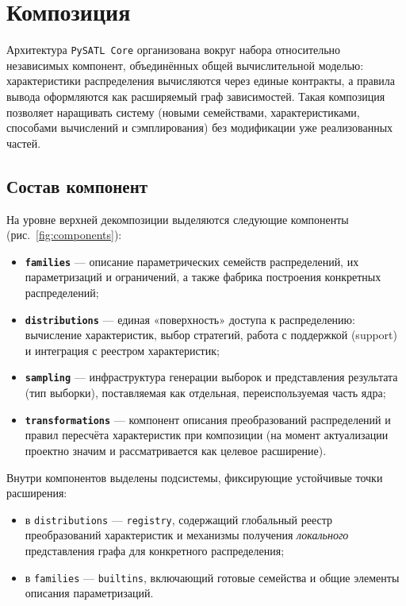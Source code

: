 \section{Композиция}
\label{sec:composition}

Архитектура \texttt{PySATL Core} организована вокруг набора относительно независимых компонент, объединённых общей вычислительной моделью: характеристики распределения вычисляются через единые контракты, а правила вывода оформляются как расширяемый граф зависимостей. Такая композиция позволяет наращивать систему (новыми семействами, характеристиками, способами вычислений и сэмплирования) без модификации уже реализованных частей.

\subsection{Состав компонент}

На уровне верхней декомпозиции выделяются следующие компоненты (рис.~\ref{fig:components}):
\begin{itemize}[compact]
  \item \textbf{\texttt{families}} --- описание параметрических семейств распределений, их параметризаций и ограничений, а также фабрика построения конкретных распределений;
  \item \textbf{\texttt{distributions}} --- единая «поверхность» доступа к распределению: вычисление характеристик, выбор стратегий, работа с поддержкой (support) и интеграция с реестром характеристик;
  \item \textbf{\texttt{sampling}} --- инфраструктура генерации выборок и представления результата (тип выборки), поставляемая как отдельная, переиспользуемая часть ядра;
  \item \textbf{\texttt{transformations}} --- компонент описания преобразований распределений и правил пересчёта характеристик при композиции (на момент актуализации проектно значим и рассматривается как целевое расширение).
\end{itemize}

Внутри компонентов выделены подсистемы, фиксирующие устойчивые точки расширения:
\begin{itemize}[compact]
  \item в \texttt{distributions} --- \texttt{registry}, содержащий глобальный реестр преобразований характеристик и механизмы получения \emph{локального} представления графа для конкретного распределения;
  \item в \texttt{families} --- \texttt{builtins}, включающий готовые семейства и общие элементы описания параметризаций.
\end{itemize}

